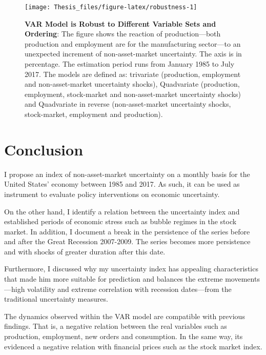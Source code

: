 \documentclass[12pt,twoside]{reedthesis}
\begin{document}
\begin{figure}

{\centering \texttt{[image: Thesis\_files/figure-latex/robustness-1]} 

}

\caption[VAR Model is Robust to Different Variable Sets and Ordering]{\textbf{VAR Model is Robust to Different Variable Sets and Ordering}: The figure shows the reaction of production---both production and employment are for the manufacturing sector---to an unexpected increment of non-asset-market uncertainty. The axis is in percentage. The estimation period runs from January 1985 to July 2017. The models are defined as: trivariate (production, employment and non-asset-market uncertainty shocks), Quadvariate (production, employment, stock-market and non-asset-market uncertainty shocks) and Quadvariate in reverse (non-asset-market uncertainty shocks, stock-market, employment and production).}\label{fig:robustness}
\end{figure}
\hypertarget{conclusion}{%
\chapter*{Conclusion}\label{conclusion}}

I propose an index of non-asset-market uncertainty on a monthly basis for the United States' economy between 1985 and 2017. As such, it can be used as instrument to evaluate policy interventions on economic uncertainty.

On the other hand, I identify a relation between the uncertainty index and established periods of economic stress such as bubble regimes in the stock market. In addition, I document a break in the persistence of the series before and after the Great Recession 2007-2009. The series becomes more persistence and with shocks of greater duration after this date.

Furthermore, I discussed why my uncertainty index has appealing characteristics that made him more suitable for prediction and balances the extreme movements---high volatility and extreme correlation with recession dates---from the traditional uncertainty measures.

The dynamics observed within the VAR model are compatible with previous findings. That is, a negative relation between the real variables such as production, employment, new orders and consumption. In the same way, its evidenced a negative relation with financial prices such as the stock market index.
\end{document}
